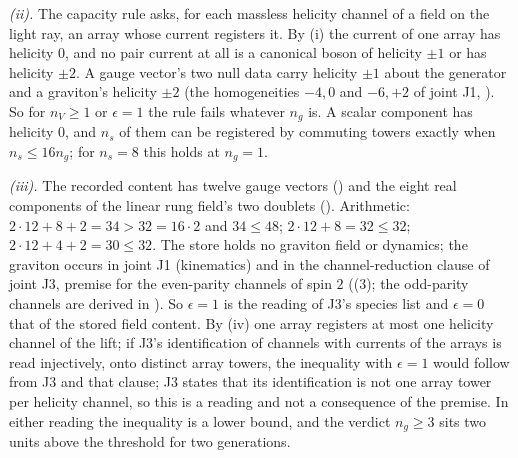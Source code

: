 \emph{(ii).} The capacity rule asks, for each massless helicity channel of a field on the light ray, an array whose current registers it. By (i) the current of one array has helicity $0$, and no pair current at all is a canonical boson of helicity $\pm 1$ or has helicity $\pm 2$. A gauge vector's two null data carry helicity $\pm 1$ about the generator and a graviton's helicity $\pm 2$ (the homogeneities $-4, 0$ and $-6, +2$ of joint J1, ). So for $n_{V} \ge 1$ or $\epsilon = 1$ the rule fails whatever $n_{g}$ is. A scalar component has helicity $0$, and $n_{s}$ of them can be registered by commuting towers exactly when $n_{s} \le 16n_{g}$; for $n_{s} = 8$ this holds at $n_{g} = 1$.

\emph{(iii).} The recorded content has twelve gauge vectors () and the eight real components of the linear rung field's two doublets (). Arithmetic: $2 \cdot 12 + 8 + 2 = 34 > 32 = 16 \cdot 2$ and $34 \le 48$; $2 \cdot 12 + 8 = 32 \le 32$; $2 \cdot 12 + 4 + 2 = 30 \le 32$. The store holds no graviton field or dynamics; the graviton occurs in joint J1 (kinematics) and in the channel-reduction clause of joint J3, premise for the even-parity channels of spin $2$ ((3); the odd-parity channels are derived in ). So $\epsilon = 1$ is the reading of J3's species list and $\epsilon = 0$ that of the stored field content. By (iv) one array registers at most one helicity channel of the lift; if J3's identification of channels with currents of the arrays is read injectively, onto distinct array towers, the inequality with $\epsilon = 1$ would follow from J3 and that clause; J3 states that its identification is not one array tower per helicity channel, so this is a reading and not a consequence of the premise. In either reading the inequality is a lower bound, and the verdict $n_{g} \ge 3$ sits two units above the threshold for two generations.


